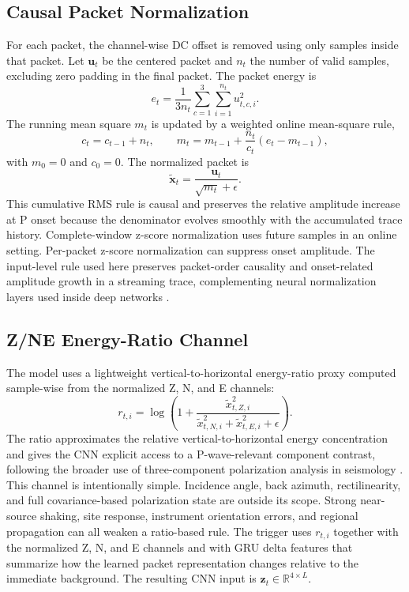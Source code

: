 \documentclass[journal]{IEEEtran}
\begin{document}
\subsection{Causal Packet Normalization}
\label{sec:norm}
For each packet, the channel-wise DC offset is removed using only samples inside that packet. Let $\mathbf{u}_t$ be the centered packet and $n_t$ the number of valid samples, excluding zero padding in the final packet. The packet energy is
\begin{equation}
  e_t = \frac{1}{3 n_t}\sum_{c=1}^{3}\sum_{i=1}^{n_t} u_{t,c,i}^2 .
\end{equation}
The running mean square $m_t$ is updated by a weighted online mean-square rule,
\begin{equation}
  c_t = c_{t-1}+n_t,\qquad
  m_t = m_{t-1} + \frac{n_t}{c_t}(e_t-m_{t-1}),
\end{equation}
with $m_0=0$ and $c_0=0$. The normalized packet is
\begin{equation}
  \tilde{\mathbf{x}}_t = \frac{\mathbf{u}_t}{\sqrt{m_t}+\epsilon}.
\end{equation}
This cumulative RMS rule is causal and preserves the relative amplitude increase at P onset because the denominator evolves smoothly with the accumulated trace history. Complete-window z-score normalization uses future samples in an online setting. Per-packet z-score normalization can suppress onset amplitude. The input-level rule used here preserves packet-order causality and onset-related amplitude growth in a streaming trace, complementing neural normalization layers used inside deep networks \cite{ioffe2015batchnorm,ba2016layernorm,wu2018groupnorm,zhang2019rmsnorm}.

\subsection{Z/NE Energy-Ratio Channel}
The model uses a lightweight vertical-to-horizontal energy-ratio proxy computed sample-wise from the normalized Z, N, and E channels:
\begin{equation}
  r_{t,i} = \log\left(1 + \frac{\tilde{x}_{t,Z,i}^{2}}
  {\tilde{x}_{t,N,i}^{2}+\tilde{x}_{t,E,i}^{2}+\epsilon}\right).
\end{equation}
The ratio approximates the relative vertical-to-horizontal energy concentration and gives the CNN explicit access to a P-wave-relevant component contrast, following the broader use of three-component polarization analysis in seismology \cite{jurkevics1988polarization}. This channel is intentionally simple. Incidence angle, back azimuth, rectilinearity, and full covariance-based polarization state are outside its scope. Strong near-source shaking, site response, instrument orientation errors, and regional propagation can all weaken a ratio-based rule. The trigger uses $r_{t,i}$ together with the normalized Z, N, and E channels and with GRU delta features that summarize how the learned packet representation changes relative to the immediate background. The resulting CNN input is $\mathbf{z}_t \in \mathbb{R}^{4\times L}$.
\end{document}
